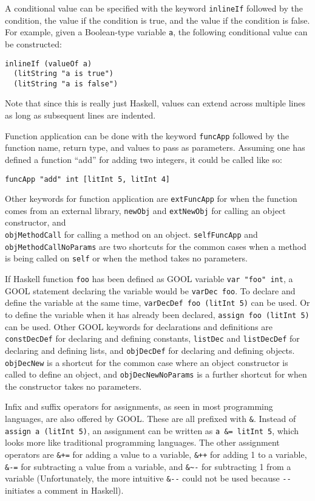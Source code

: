 \documentclass[sigplan,review,anonymous]{acmart}
\begin{document}
A conditional value can be specified with the keyword \verb|inlineIf| followed 
by the condition, the value if the condition is true, and the value if the 
condition is false. For example, given a Boolean-type variable \verb|a|, the 
following conditional value can be constructed:
\begin{lstlisting}
inlineIf (valueOf a) 
  (litString "a is true") 
  (litString "a is false")
\end{lstlisting}
Note that since this is really just Haskell, values can extend across multiple 
lines as long as subsequent lines are indented.

Function application can be done with the keyword \verb|funcApp| followed by 
the function name, return type, and values to pass as parameters. Assuming one 
has defined a function ``add'' for adding two integers, it could be called like 
so:
\begin{lstlisting}
funcApp "add" int [litInt 5, litInt 4]
\end{lstlisting}
Other keywords for function application are \verb|extFuncApp| for when the 
function comes from an external library, \verb|newObj| and \verb|extNewObj| 
for calling an object constructor, and \\
\verb|objMethodCall| for calling a method on an object. \verb|selfFuncApp| and 
\verb|objMethodCallNoParams| are two shortcuts for the common cases when a 
method is being called on \verb|self| or when the method takes no parameters. 

If Haskell function \verb|foo| has been defined as GOOL variable 
\verb|var "foo" int|, a GOOL statement declaring the variable would be
\verb|varDec foo|. To declare and define the variable at the same time,
\verb|varDecDef foo (litInt 5)| can be used. Or to define the variable when it
has already been declared, \verb|assign foo (litInt 5)| can be used. Other GOOL 
keywords for declarations and definitions are \verb|constDecDef| for declaring 
and defining constants, \verb|listDec| and \verb|listDecDef| for declaring and 
defining lists, and \verb|objDecDef| for declaring and defining objects. 
\verb|objDecNew| is a shortcut for the common case where an object constructor 
is called to define an object, and \verb|objDecNewNoParams| is a further 
shortcut for when the constructor takes no parameters.

Infix and suffix operators for assignments, as seen in most programming 
languages, are also offered by GOOL. These are all prefixed with \verb|&|. 
Instead of \verb|assign a (litInt 5)|, an assignment can be written as 
\verb|a &= litInt 5|, which looks more like traditional programming languages. 
The other assignment operators are \verb|&+=| for adding a value to a variable, 
\verb|&++| for adding 1 to a variable, \verb|&-=| for subtracting a value 
from a variable, and \verb|&~-| for subtracting 1 from a variable 
(Unfortunately, the more intuitive \verb|&--| could not be used because 
\verb|--| initiates a comment in Haskell).
\end{document}
